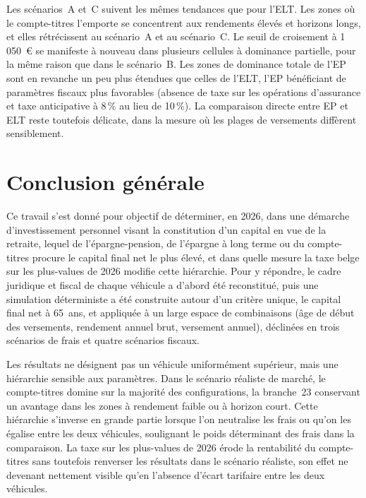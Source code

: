 ﻿\documentclass[12pt, a4paper]{article}
\begin{document}
Les scénarios~A et~C suivent les mêmes tendances que pour l'ELT.
Les zones où le compte-titres l'emporte se
concentrent aux rendements élevés et horizons longs, et elles 
rétrécissent au scénario~A et au scénario~C. Le seuil de croisement à
1\,050~€ se manifeste à nouveau dans plusieurs cellules à dominance
partielle, pour la même raison que dans le scénario~B. Les zones de
dominance totale de l'EP sont en revanche un peu plus étendues que
celles de l'ELT, l'EP bénéficiant de paramètres fiscaux plus favorables
(absence de taxe sur les opérations d'assurance et taxe anticipative à
8\,\% au lieu de 10\,\%). La comparaison directe entre EP et ELT reste
toutefois délicate, dans la mesure où les plages de versements diffèrent
sensiblement.

\newpage
\section*{Conclusion générale}

Ce travail s'est donné pour objectif de déterminer, en 2026, dans une
démarche d'investissement personnel visant la constitution d'un capital en
vue de la retraite, lequel de l'épargne-pension, de l'épargne à long terme
ou du compte-titres procure le capital final net le plus élevé, et dans
quelle mesure la taxe belge sur les plus-values de 2026 modifie cette
hiérarchie. Pour y répondre, le cadre juridique et fiscal de chaque
véhicule a d'abord été reconstitué, puis une simulation déterministe a été
construite autour d'un critère unique, le capital final net à 65~ans, et
appliquée à un large espace de combinaisons (âge de début des versements,
rendement annuel brut, versement annuel), déclinées en trois scénarios de
frais et quatre scénarios fiscaux.

Les résultats ne désignent pas un véhicule uniformément supérieur, mais
une hiérarchie sensible aux paramètres. Dans le scénario réaliste de
marché, le compte-titres domine sur la majorité des configurations, la
branche~23 conservant un avantage dans les zones à rendement faible ou à
horizon court. Cette hiérarchie s'inverse en grande partie lorsque l'on
neutralise les frais ou qu'on les égalise entre les deux véhicules,
soulignant le poids déterminant des frais dans la comparaison. La taxe
sur les plus-values de 2026 érode la rentabilité du compte-titres sans
toutefois renverser les résultats dans le scénario réaliste, son effet
ne devenant nettement visible qu'en l'absence d'écart tarifaire entre
les deux véhicules.
\end{document}
